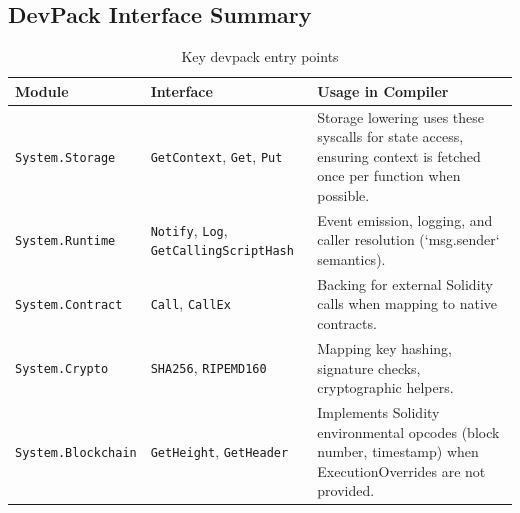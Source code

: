 \documentclass[11pt]{article}
\begin{document}
\subsection{DevPack Interface Summary}
\begin{table}[H]
\centering
\caption{Key devpack entry points}
\begin{tabularx}{\textwidth}{@{}p{}p{}X@{}}
\toprule
Module & Interface & Usage in Compiler \\
\midrule
\texttt{System.Storage} & \texttt{GetContext}, \texttt{Get}, \texttt{Put} & Storage lowering uses these syscalls for state access, ensuring context is fetched once per function when possible.\\
\texttt{System.Runtime} & \texttt{Notify}, \texttt{Log}, \texttt{GetCallingScriptHash} & Event emission, logging, and caller resolution (`msg.sender` semantics).\\
\texttt{System.Contract} & \texttt{Call}, \texttt{CallEx} & Backing for external Solidity calls when mapping to native contracts.\\
\texttt{System.Crypto} & \texttt{SHA256}, \texttt{RIPEMD160} & Mapping key hashing, signature checks, cryptographic helpers.\\
\texttt{System.Blockchain} & \texttt{GetHeight}, \texttt{GetHeader} & Implements Solidity environmental opcodes (block number, timestamp) when ExecutionOverrides are not provided.\\
\bottomrule
\end{tabularx}
\end{table}
\end{document}
